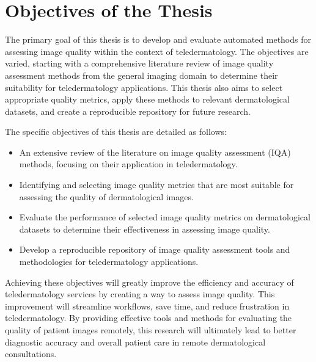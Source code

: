 \section{Objectives of the Thesis}
\label{sec:Objectives}
The primary goal of this thesis is to develop and evaluate automated methods for assessing image quality within the context of teledermatology. The objectives are varied, starting with a comprehensive literature review of image quality assessment methods from the general imaging domain to determine their suitability for teledermatology applications. This thesis also aims to select appropriate quality metrics, apply these methods to relevant dermatological datasets, and create a reproducible repository for future research. \par
\vspace{\baselineskip}
The specific objectives of this thesis are detailed as follows:
\begin{itemize}
    \item An extensive review of the literature on image quality assessment (IQA) methods, focusing on their application in teledermatology.
    \item Identifying and selecting image quality metrics that are most suitable for assessing the quality of dermatological images.
    \item Evaluate the performance of selected image quality metrics on dermatological datasets to determine their effectiveness in assessing image quality.
    \item Develop a reproducible repository of image quality assessment tools and methodologies for teledermatology applications.
\end{itemize}
\noindent
Achieving these objectives will greatly improve the efficiency and accuracy of teledermatology services by creating a way to assess image quality. This improvement will streamline workflows, save time, and reduce frustration in teledermatology. By providing effective tools and methods for evaluating the quality of patient images remotely, this research will ultimately lead to better diagnostic accuracy and overall patient care in remote dermatological consultations. \par

